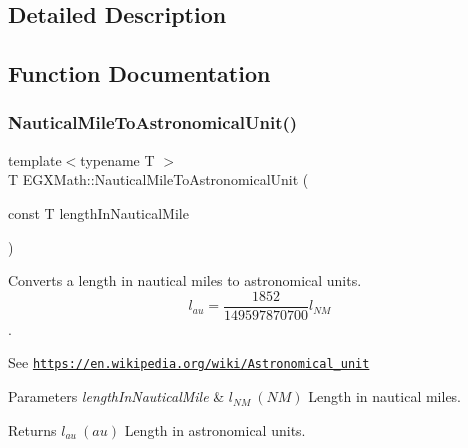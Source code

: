 \subsection{Detailed Description}


\subsection{Function Documentation}
\mbox{\label{group___e_g_x_math-_conversions-_length_conversions-_nautical-_nautical_mile-_astronomical_ga637834e348d5ca8b121204dcff671e7d}} 
\subsubsection{\texorpdfstring{Nautical\+Mile\+To\+Astronomical\+Unit()}{NauticalMileToAstronomicalUnit()}}
{\footnotesize\ttfamily template$<$typename T $>$ \\
T E\+G\+X\+Math\+::\+Nautical\+Mile\+To\+Astronomical\+Unit (\begin{DoxyParamCaption}\item[{const T}]{length\+In\+Nautical\+Mile }\end{DoxyParamCaption})}



Converts a length in nautical miles to astronomical units. \[ l_{au}= \frac{1852}{149597870700} l_{NM} \]. 

See \href{https://en.wikipedia.org/wiki/Astronomical_unit}{\tt https\+://en.\+wikipedia.\+org/wiki/\+Astronomical\+\_\+unit} 
\begin{DoxyParams}{Parameters}
{\em length\+In\+Nautical\+Mile} & $ l_{NM}\ (NM)$ Length in nautical miles. \\
\hline
\end{DoxyParams}
\begin{DoxyReturn}{Returns}
$ l_{au}\ (au)$ Length in astronomical units. 
\end{DoxyReturn}
\mbox{\label{group___e_g_x_math-_conversions-_length_conversions-_nautical-_nautical_mile-_astronomical_ga895ab2142f00d16718fa0297d076caa3}} 

